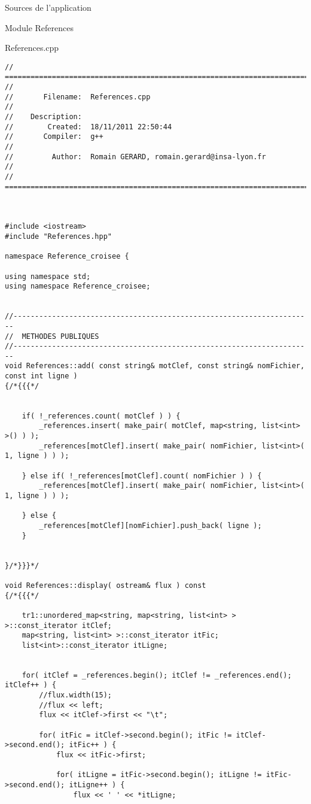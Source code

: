 \documentclass{article}
\begin{document}
\begin{section}{Sources de l'application}
\begin{subsection}{Module References}
\newpage
  \begin{paragraph}{References.cpp}
   \begin{verbatim}
// =====================================================================================
//
//       Filename:  References.cpp
//
//    Description:
//        Created:  18/11/2011 22:50:44
//       Compiler:  g++
//
//         Author:  Romain GERARD, romain.gerard@insa-lyon.fr
//
// =====================================================================================



#include <iostream>
#include "References.hpp"

namespace Reference_croisee {

using namespace std;
using namespace Reference_croisee;


//----------------------------------------------------------------------
//  METHODES PUBLIQUES
//----------------------------------------------------------------------
void References::add( const string& motClef, const string& nomFichier, const int ligne )
{/*{{{*/


    if( !_references.count( motClef ) ) {
        _references.insert( make_pair( motClef, map<string, list<int> >() ) );
        _references[motClef].insert( make_pair( nomFichier, list<int>( 1, ligne ) ) );

    } else if( !_references[motClef].count( nomFichier ) ) {
        _references[motClef].insert( make_pair( nomFichier, list<int>( 1, ligne ) ) );

    } else {
        _references[motClef][nomFichier].push_back( ligne );
    }


}/*}}}*/

void References::display( ostream& flux ) const
{/*{{{*/

    tr1::unordered_map<string, map<string, list<int> > >::const_iterator itClef;
    map<string, list<int> >::const_iterator itFic;
    list<int>::const_iterator itLigne;


    for( itClef = _references.begin(); itClef != _references.end(); itClef++ ) {
        //flux.width(15);
        //flux << left;
        flux << itClef->first << "\t";

        for( itFic = itClef->second.begin(); itFic != itClef->second.end(); itFic++ ) {
            flux << itFic->first;

            for( itLigne = itFic->second.begin(); itLigne != itFic->second.end(); itLigne++ ) {
                flux << ' ' << *itLigne;


\end{verbatim}
\end{paragraph}
\end{subsection}
\end{section}
\end{document}
